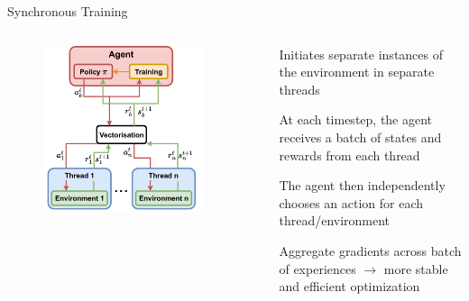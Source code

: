 \begin{frame}{Synchronous Training}

\begin{columns}
    \begin{column}{0.5\textwidth}
    \begin{figure}
        \centering
        \includegraphics[width=0.9\textwidth]{images/chapter_8/synchronous_training.pdf}
        \label{fig:enter-label}
    \end{figure}
    \end{column}
    \begin{column}{0.5\textwidth}
        \blist
            \item Initiates separate instances of the environment in separate threads
            \item At each timestep, the agent receives a batch of states and rewards from each thread
            \item The agent then independently chooses an action for each thread/environment
            \item Aggregate gradients across batch of experiences $\rightarrow$ more stable and efficient optimization
        \elist
    \end{column}
\end{columns}
\end{frame}

